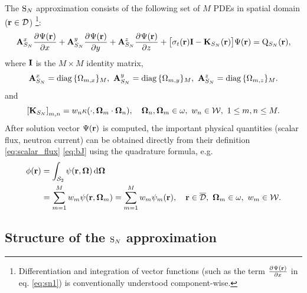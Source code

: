 The $\text{S}_{N}$ approximation consists of the
following set of $M$ PDEs in spatial domain ($\mathbf{r}\in\mathcal{D}$) \footnote{Differentiation and integration of vector functions
(such as the term $\frac{\partial^{}\Psi(\mathbf{r})}{\partial x^{}}$ in eq. \eqref{eq:sn1}) is conventionally understood component-wise.}:
\begin{equation}\label{eq:sn1} 
\mathbf{A}_{S_N}^x\frac{\partial^{}\Psi(\mathbf{r})}{\partial x^{}} + \mathbf{A}_{S_N}^y\frac{\partial^{}\Psi(\mathbf{r})}{\partial y^{}} +
\mathbf{A}_{S_N}^z\frac{\partial^{}\Psi(\mathbf{r})}{\partial z^{}} + \bigl[\sigma_t(\mathbf{r})\mathbf{I} - \mathbf{K}_{S_N}(\mathbf{r})\bigr]\Psi(\mathbf{r}) = \mathrm{Q}_{S_N}(\mathbf{r}),
\end{equation}
where $\mathbf{I}$ is the $M\times M$ identity matrix,
$$
	\mathbf{A}_{S_N}^x = \operatorname{diag\,}\{\Omega_{m,x}\}_{M},\ \mathbf{A}_{S_N}^y = \operatorname{diag\,}\{\Omega_{m,y}\}_{M},\
	\mathbf{A}_{S_N}^z = \operatorname{diag\,}\{\Omega_{m,z}\}_{M}.
$$
and
\begin{equation}\label{eq:SNK}
	\left[\mathbf{K}_{S_N}\right]_{m,n} = w_n \kappa(\cdot,\mathbf{\Omega}_m\cdot\mathbf{\Omega}_n),\quad
	\mathbf{\Omega}_n,\mathbf{\Omega}_m\in \omega,\ w_n\in \mathcal{W},\ 1 \leq m,n \leq M.
\end{equation}
After solution vector $\Psi(\mathbf{r})$ is computed, the
important physical quantities (scalar flux, neutron current) can be obtained directly from their definition \eqref{eq:scalar_flux}
\eqref{eq:bJ} using the quadrature formula, e.g.
\begin{equation}\label{eq:scalar_flux_sn}
\begin{aligned}
	\phi(\mathbf{r}) &= \int_{\mathcal{S}_2}\psi(\mathbf{r},\mathbf{\Omega})\,\text{d}\mathbf{\Omega}\,\\
	 &= \sum_{m=1}^{M} w_m \psi(\mathbf{r},\mathbf{\Omega}_m) = \sum_{m=1}^{M} w_m \psi_m(\mathbf{r}), \quad
	\mathbf{r}\in \overline{\mathcal{D}},\ \mathbf{\Omega}_m\in \omega,\ w_m\in \mathcal{W}.
\end{aligned}
\end{equation}



\subsection{Structure of the $\text{S}_{N}$ approximation}
